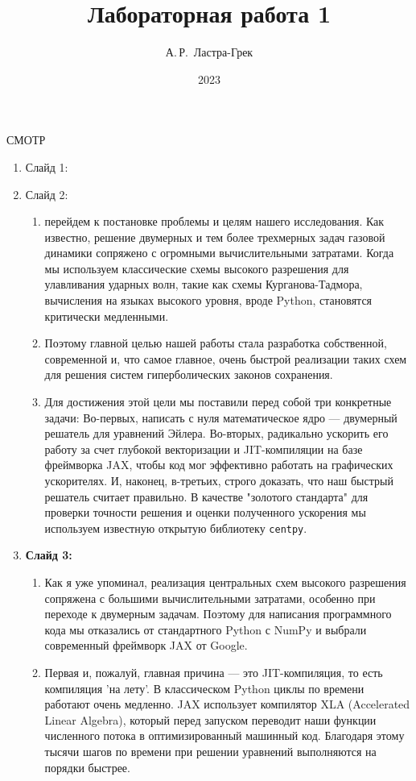 \documentclass[12pt, a4paper]{article}
\title{Лабораторная работа 1}
\author{А.\,Р.~Ластра-Грек}
\date{2023}
\theoremstyle{gostdef}
\begin{document}
	
	\begin{center}
		СМОТР
	\end{center}
	
	\begin{enumerate}
	
		\item Слайд 1:
		\item Слайд 2:
		\begin{enumerate}
			\item перейдем к постановке проблемы и целям нашего исследования.
			Как известно, решение двумерных и тем более трехмерных задач газовой динамики сопряжено с огромными вычислительными затратами. Когда мы используем классические схемы высокого разрешения для улавливания ударных волн, такие как схемы Курганова-Тадмора, вычисления на языках высокого уровня, вроде Python, становятся критически медленными.
			\item Поэтому главной целью нашей работы стала разработка собственной, современной и, что самое главное, очень быстрой реализации таких схем для решения систем гиперболических законов сохранения.
			\item Для достижения этой цели мы поставили перед собой три конкретные задачи:
			Во-первых, написать с нуля математическое ядро — двумерный решатель для уравнений Эйлера.
			Во-вторых, радикально ускорить его работу за счет глубокой векторизации и JIT-компиляции на базе фреймворка JAX, чтобы код мог эффективно работать на графических ускорителях.
			И, наконец, в-третьих, строго доказать, что наш быстрый решатель считает правильно. В качестве "золотого стандарта" для проверки точности решения и оценки полученного ускорения мы используем известную открытую библиотеку \texttt{centpy}.
		\end{enumerate}
		\item \textbf{Слайд 3:}
		\begin{enumerate}
			\item Как я уже упоминал, реализация центральных схем высокого разрешения сопряжена с большими вычислительными затратами, особенно при переходе к двумерным задачам. Поэтому для написания программного кода мы отказались от стандартного Python с NumPy и выбрали современный фреймворк JAX от Google.
			\item Первая и, пожалуй, главная причина — это JIT-компиляция, то есть компиляция 'на лету'. В классическом Python циклы по времени работают очень медленно. JAX использует компилятор XLA (Accelerated Linear Algebra), который перед запуском переводит наши функции численного потока в оптимизированный машинный код. Благодаря этому тысячи шагов по времени при решении уравнений выполняются на порядки быстрее.

\end{enumerate}
\end{enumerate}
\end{document}
